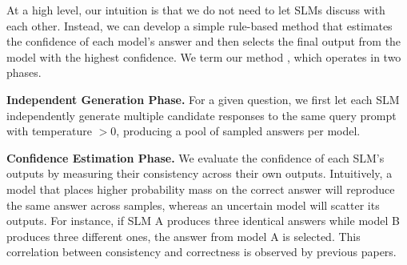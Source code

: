 






At a high level, our intuition is that we do not need to let SLMs discuss with each other. Instead, we can develop a simple rule-based method that estimates the confidence of each model’s answer and then selects the final output from the model with the highest confidence. We term our method \textbf{\NAME{}{}}, which operates in two phases.

\textbf{Independent Generation Phase.} For a given question, we first let each SLM independently generate multiple candidate responses to the same query prompt with temperature $>0$, producing a pool of sampled answers per model.

\textbf{Confidence Estimation Phase.} We evaluate the confidence of each SLM’s outputs by measuring their consistency across their own outputs. Intuitively, a model that places higher probability mass on the correct answer will reproduce the same answer across samples, whereas an uncertain model will scatter its outputs. For instance, if SLM A produces three identical answers while model B produces three different ones, the answer from model A is selected. This correlation between consistency and correctness is observed by previous papers.~\citep{wang2023selfconsistencyimproveschainthought,xie2024calibratingreasoninglanguagemodels,Taubenfeld_2025,chen2023universalselfconsistencylargelanguage} 

